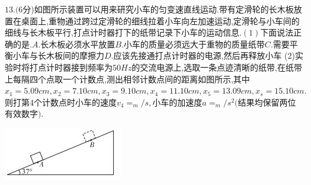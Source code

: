 \question[6] $13.(6$分)如图所示装置可以用来研究小车的匀变速直线运动.带有定滑轮的长木板放置在桌面上,重物通过跨过定滑轮的细线拉着小车向左加速运动,定滑轮与小车间的细线与长木板平行,打点计时器打下的纸带记录下小车的运动信息$.
(1)$下面说法正确的是$.A.$长木板必须水平放置$B.$小车的质量必须远大于重物的质量纸带$C.$需要平衡小车与长木板间的摩擦力$D.$应该先接通打点计时器的电源,然后再释放小车
(2)实验时将打点计时器接到频率为$50Hz$的交流电源上,选取一条点迹清晰的纸带,在纸带上每隔四个点取一个计数点,测出相邻计数点间的距离如图所示,其中$x_1=5.09cm,x_2=7.10cm,x_3=9.10cm,x_4=11.10cm,x_5=13.09cm,x_s=15.10cm.$则打第4个计数点时小车的速度$v_4=_m/s,$小车的加速度$a=_m/s^2($结果均保留两位有效数字$).$
\begin{center}
\includegraphics[]{img/image13.jpeg}
\end{center}

